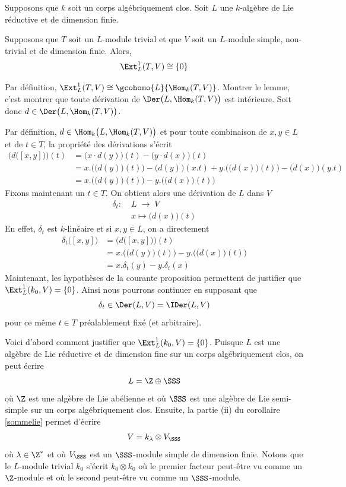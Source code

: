 \begin{Prop} \label{mapremierepropyo} Supposons que $k$ soit un corps algébriquement clos. Soit $L$ une $k$-algèbre de Lie réductive et de dimension finie. 

Supposons que $T$ soit un $L$-module trivial et que $V$ soit un $L$-module simple, non-trivial et de dimension finie. Alors,
$$ \Ext_L^1(T,V) \cong \{0\} $$
\begin{pre} Par définition, $\Ext_L^1(T,V) \cong \gcohomo{L}{\Hom_k(T,V)}$. Montrer le lemme, c'est montrer que toute dérivation de $\Der\big(L,\Hom_k(T,V)\big)$ est intérieure. Soit donc $d \in \Der\big(L,\Hom_k(T,V)\big)$.

Par définition, $d \in \Hom_k\big(L,\Hom_k(T,V)\big)$ et pour toute combinaison de $x,y \in L$ et de $t \in T$, la propriété des dérivations s'écrit
\begin{align*}
\Big(d\big([x,y]\big)\Big)(t) &= \big(x \cdot d(y)\big)(t) - \big(y \cdot d(x)\big)(t)\\
&= x.\Big(\big(d(y)\big)(t)\Big) - \big(d(y)\big)(x.t) + y.\Big(\big(d(x)\big)(t)\Big) - \big(d(x)\big)(y.t)\\
&= x.\Big(\big(d(y)\big)(t)\Big) - y.\Big(\big(d(x)\big)(t)\Big)
\end{align*}
Fixons maintenant un $t \in T$. On obtient alors une dérivation de $L$ dans $V$
\begin{align} \label{deltat}
\delta_t : \; &L \; \longrightarrow \; V\\
&x \longmapsto \big(d(x)\big)(t) \nonumber
\end{align}
En effet, $\delta_t$ est $k$-linéaire et si $x,y \in L$, on a directement 
\begin{align*}
\delta_t\big([x,y]\big) &= \Big(d\big([x,y]\big)\Big)(t)\\
&= x.\Big(\big(d(y)\big)(t)\Big) - y.\Big(\big(d(x)\big)(t)\Big)\\
&= x.\delta_t(y) - y.\delta_t(x)
\end{align*}
Maintenant, les hypothèses de la courante proposition permettent de justifier que \linebreak $\Ext_L^1(k_0,V) = \{0\}$. Ainsi nous pourrons continuer en supposant que 
$$ \delta_t \in \Der(L,V) = \IDer(L,V) $$ 
pour ce même $t \in T$ préalablement fixé (et arbitraire). 

Voici d'abord comment justifier que $\Ext_L^1(k_0,V) = \{0\}$. Puisque $L$ est une algèbre de Lie réductive et de dimension fine sur un corps algébriquement clos, on peut écrire
$$ L = \Z \oplus \SSS $$
où $\Z$ est une algèbre de Lie abélienne et où $\SSS$ est une algèbre de Lie semi-simple sur un corps algébriquement clos. Ensuite, la partie (ii) du corollaire \ref{sommelie} permet d'écrire
$$ V = k_\lambda \otimes V_\SSS $$
où $\lambda \in \Z^*$ et où $V_\SSS$ est un $\SSS$-module simple de dimension finie. Notons que le $L$-module trivial $k_0$ s'écrit $k_0 \otimes k_0$ où le premier facteur peut-être vu comme un $\Z$-module et où le second peut-être vu comme un $\SSS$-module.


\end{pre}
\end{Prop}

